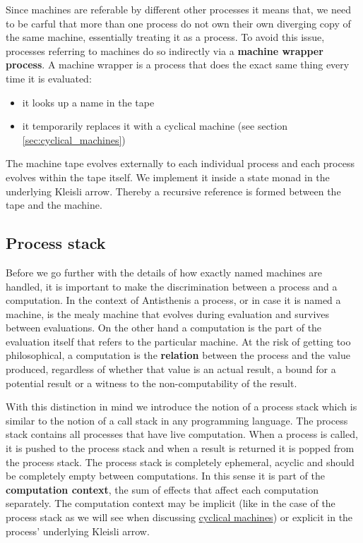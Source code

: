 Since machines are referable by different other processes it means
that, we need to be carful that more than one process do not own their
own diverging copy of the same machine, essentially treating it as a
process. To avoid this issue, processes referring to machines do so
indirectly via a \textbf{machine wrapper process}. A machine wrapper is a
process that does the exact same thing every time it is evaluated:

\begin{itemize}
\item it looks up a name in the tape
\item it temporarily replaces it with a cyclical machine (see section
  \ref{sec:cyclical_machines})
\end{itemize}

The machine tape evolves externally to each individual process and
each process evolves within the tape itself. We implement it inside a
state monad in the underlying Kleisli arrow. Thereby a recursive
reference is formed between the tape and the machine.
\subsection{Process stack}
\label{sec:process_stack}
Before we go further with the details of how exactly named machines
are handled, it is important to make the discrimination between a
process and a computation. In the context of Antisthenis a process, or
in case it is named a machine, is the mealy machine that evolves
during evaluation and survives between evaluations. On the other hand
a computation is the part of the evaluation itself that refers to the
particular machine. At the risk of getting too philosophical, a
computation is the \textbf{relation} between the process and the value
produced, regardless of whether that value is an actual result, a
bound for a potential result or a witness to the non-computability of
the result.

With this distinction in mind we introduce the notion of a process
stack which is similar to the notion of a call stack in any
programming language. The process stack contains all processes that
have live computation. When a process is called, it is pushed to the
process stack and when a result is returned it is popped from the
process stack. The process stack is completely ephemeral, acyclic and
should be completely empty between computations. In this sense it is
part of the \textbf{computation context}, the sum of effects that
affect each computation separately. The computation context may be
implicit (like in the case of the process stack as we will see when
discussing \hyperref[sec:cyclical_machines]{cyclical machines}) or
explicit in the process' underlying Kleisli arrow.

